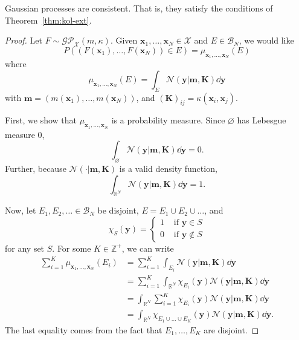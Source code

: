 \begin{theorem}
    \label{thm:gp-const}
    Gaussian processes are consistent.
    That is, they satisfy the conditions of Theorem~\ref{thm:kol-ext}.
\end{theorem}
\begin{proof}
    Let $F \sim \mathcal{GP}_{ \mathcal{X} }(m, \kappa)$.
    Given $\mathbf{x}_1, \dots, \mathbf{x}_N \in \mathcal{X}$ and $E \in \mathcal{B}_N$,
    we would like
    \begin{equation*}
        P((F(\mathbf{x}_1), \dots, F(\mathbf{x}_N)) \in E) = \mu_{\mathbf{x}_1, \dots, \mathbf{x}_N}(E)
    \end{equation*}
    where
    \begin{equation*}
        \mu_{\mathbf{x}_1, \dots, \mathbf{x}_N}(E)
        = \int_{E} \mathcal{N}( \mathbf{y} | \mathbf{m}, \mathbf{K}) \dd \mathbf{y}
    \end{equation*}
    with $\mathbf{m} = (m(\mathbf{x}_1), \dots, m(\mathbf{x}_N))$, and $(\mathbf{K})_{ij} = \kappa(\mathbf{x}_i, \mathbf{x}_j)$.

    First, we show that $\mu_{\mathbf{x}_1, \dots, \mathbf{x}_N}$ is a probability measure.
    Since $\varnothing$ has Lebesgue measure 0,
    \begin{equation*}
        \int_{\varnothing} \mathcal{N}(\mathbf{y} | \mathbf{m}, \mathbf{K}) \dd \mathbf{y} = 0.
    \end{equation*}
    Further, because $\mathcal{N}( \cdot | \mathbf{m}, \mathbf{K})$ is a valid density function,
    \begin{equation*}
        \int_{\mathbb{R}^{N}} \mathcal{N}(\mathbf{y} | \mathbf{m}, \mathbf{K}) \dd \mathbf{y} = 1.
    \end{equation*}

    Now, let $E_1, E_2, \dots \in \mathcal{B}_{N}$ be disjoint, $E = E_1 \cup E_2 \cup \dots$, and
    \begin{equation*}
        \chi_{S}(\mathbf{y}) =
        \begin{cases}
            1 & \text{ if $\mathbf{y} \in S$} \\
            0 & \text{ if $\mathbf{y} \notin S$}
        \end{cases}
    \end{equation*}
    for any set $S$.
    For some $K \in \mathbb{Z}^{+}$, we can write
    \begin{align*}
        \sum_{i = 1}^{K} \mu_{\mathbf{x}_1, \dots, \mathbf{x}_N}(E_i)
        & = \sum_{i = 1}^{K} \int_{E_i} \mathcal{N}(\mathbf{y} | \mathbf{m}, \mathbf{K}) \dd \mathbf{y} \\
        & = \sum_{i = 1}^{K} \int_{\mathbb{R}^{N}} \chi_{E_i}(\mathbf{y})\mathcal{N}(\mathbf{y} | \mathbf{m}, \mathbf{K}) \dd \mathbf{y} \\
        & =  \int_{\mathbb{R}^{N}} \sum_{i = 1}^{K}\chi_{E_i}(\mathbf{y})\mathcal{N}(\mathbf{y} | \mathbf{m}, \mathbf{K}) \dd \mathbf{y} \\
        & =  \int_{\mathbb{R}^{N}} \chi_{E_1 \cup \dots \cup E_K}(\mathbf{y})\mathcal{N}(\mathbf{y} | \mathbf{m}, \mathbf{K}) \dd \mathbf{y}.
    \end{align*}
    The last equality comes from the fact that $E_1, \dots, E_K$ are disjoint.


\end{proof}
